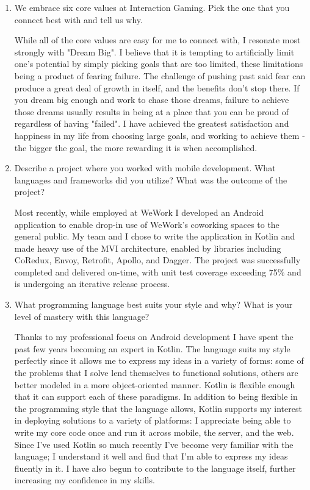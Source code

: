 \documentclass[9pt,letterpaper]{article}
\begin{document}
\begin{enumerate}
	\item We embrace six core values at Interaction Gaming. Pick the one that you connect best with and tell us why.

		While all of the core values are easy for me to connect with, I resonate most strongly with "Dream Big". I believe that it is tempting to artificially limit one's potential by simply picking goals that are too limited, these limitations being a product of fearing failure. The challenge of pushing past said fear can produce a great deal of growth in itself, and the benefits don't stop there. If you dream big enough and work to chase those dreams, failure to achieve those dreams usually results in being at a place that you can be proud of regardless of having "failed". I have achieved the greatest satisfaction and happiness in my life from choosing large goals, and working to achieve them - the bigger the goal, the more rewarding it is when accomplished.

	\item Describe a project where you worked with mobile development. What languages and frameworks did you utilize? What was the outcome of the project?

		Most recently, while employed at WeWork I developed an Android application to enable drop-in use of WeWork's coworking spaces to the general public. My team and I chose to write the application in Kotlin and made heavy use of the MVI architecture, enabled by libraries including CoRedux, Envoy, Retrofit, Apollo, and Dagger. The project was successfully completed and delivered on-time, with unit test coverage exceeding 75\% and is undergoing an iterative release process.

	\item What programming language best suits your style and why? What is your level of mastery with this language?

		Thanks to my professional focus on Android development I have spent the past few years becoming an expert in Kotlin. The language suits my style perfectly since it allows me to express my ideas in a variety of forms: some of the problems that I solve lend themselves to functional solutions, others are better modeled in a more object-oriented manner. Kotlin is flexible enough that it can support each of these paradigms. In addition to being flexible in the programming style that the language allows, Kotlin supports my interest in deploying solutions to a variety of platforms: I appreciate being able to write my core code once and run it across mobile, the server, and the web. Since I've used Kotlin so much recently I've become very familiar with the language; I understand it well and find that I'm able to express my ideas fluently in it. I have also begun to contribute to the language itself, further increasing my confidence in my skills.


\end{enumerate}
\end{document}
